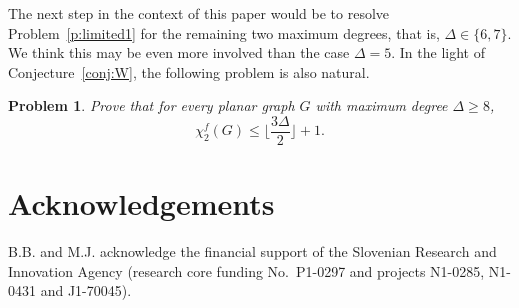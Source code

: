 \documentclass[11pt]{article}
\newcommand{\fk}{\chi_{k}^{f}}
\newcommand{\fd}{\chi_{2}^{f}}
\newtheorem{problem}[theorem]{Problem}
\begin{document}
The next step in the context of this paper would be to resolve Problem~\ref{p:limited1} for the remaining two maximum degrees, that is, $\Delta\in \{6,7\}$. We think this may be even more involved than the case $\Delta=5$. In the light of Conjecture~\ref{conj:W}, the following problem is also natural. 

\begin{problem}
Prove that for every planar graph $G$ with maximum degree $\Delta\ge 8$, $$\fd(G)\le \Big\lfloor\frac{3\Delta}{2}\Big\rfloor+1.$$ 
\end{problem}



 


\section*{Acknowledgements}
B.B. and M.J. acknowledge the financial support of the Slovenian Research and Innovation Agency (research core funding No.\ P1-0297 and projects N1-0285, N1-0431 and J1-70045).
\end{document}

